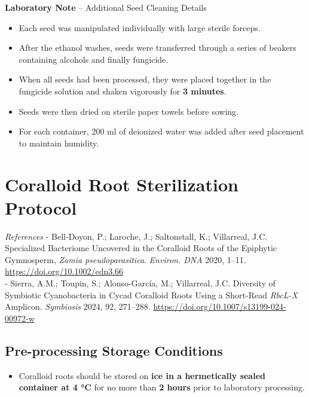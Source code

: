 \documentclass[
  11pt,
]{article}
\providecommand{\tightlist}{%
  \setlength{\itemsep}{0pt}\setlength{\parskip}{0pt}}
\begin{document}
\textbf{Laboratory Note} -- Additional Seed Cleaning Details

\begin{itemize}
\tightlist
\item
  Each seed was manipulated individually with large sterile forceps.\\
\item
  After the ethanol washes, seeds were transferred through a series of
  beakers containing alcohols and finally fungicide.\\
\item
  When all seeds had been processed, they were placed together in the
  fungicide solution and shaken vigorously for \textbf{3 minutes}.\\
\item
  Seeds were then dried on sterile paper towels before sowing.\\
\item
  For each container, 200 ml of deionized water was added after seed
  placement to maintain humidity.
\end{itemize}

\section{Coralloid Root Sterilization
Protocol}\label{coralloid-root-sterilization-protocol}

\emph{References} - Bell‐Doyon, P.; Laroche, J.; Saltonstall, K.;
Villarreal, J.C. Specialized Bacteriome Uncovered in the Coralloid Roots
of the Epiphytic Gymnosperm, \emph{Zamia pseudoparasitica}.
\emph{Environ. DNA} 2020, 1--11. \url{https://doi.org/10.1002/edn3.66}\\
- Sierra, A.M.; Toupin, S.; Alonso-García, M.; Villarreal, J.C.
Diversity of Symbiotic Cyanobacteria in Cycad Coralloid Roots Using a
Short-Read \emph{RbcL-X} Amplicon. \emph{Symbiosis} 2024, 92, 271--288.
\url{https://doi.org/10.1007/s13199-024-00972-w}

\subsection{Pre-processing Storage
Conditions}\label{pre-processing-storage-conditions}

\begin{itemize}
\tightlist
\item
  Coralloid roots should be stored on \textbf{ice in a hermetically
  sealed container at 4 °C} for no more than \textbf{2 hours} prior to
  laboratory processing.
\end{itemize}
\end{document}
